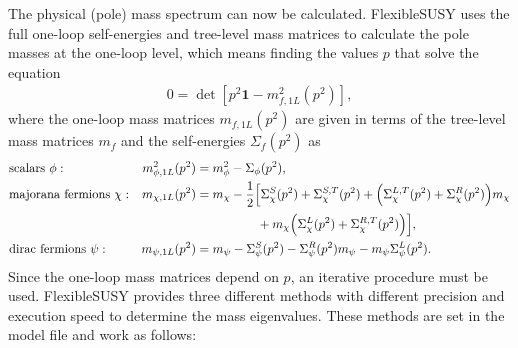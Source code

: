\documentclass[final,3p,11pt,pdflatex]{elsarticle}
\makeatletter
\newcommand{\fs}{FlexibleSUSY\@\xspace}
\newcommand{\unity}{\mathbf{1}}
\makeatother
\begin{document}
The physical (pole) mass spectrum can now be calculated.  \fs uses the
full one-loop self-energies and tree-level mass matrices to calculate
the pole masses at the one-loop level, which means finding the values
$p$ that solve the equation
%
\begin{align}
  0 = \det\left[p^2\unity - m^2_{f,1L}(p^2)\right],
\end{align}
%
where the one-loop mass matrices $m_{f,1L}(p^2)$ are given in terms of
the tree-level mass matrices $m_f$ and the self-energies
$\Sigma_f(p^2)$ as
%
\begin{align}
  &\text{scalars } \phi: &
  m^2_{\phi,1L}(p^2) &= m^2_{\phi} - \Sigma_\phi(p^2), \\
  &\text{majorana fermions } \chi: &
  m_{\chi,1L}(p^2) &= m_{\chi} - \frac{1}{2}\Big[
    \Sigma_\chi^S(p^2) + \Sigma_\chi^{S,T}(p^2)
    + \Big( \Sigma_\chi^{L,T}(p^2) + \Sigma_\chi^R(p^2) \Big) m_{\chi} \notag \\
    &&&\phantom{= m_{\chi} - \frac{1}{2}\Big[}
    + m_{\chi} \Big( \Sigma_\chi^L(p^2) + \Sigma_\chi^{R,T}(p^2) \Big)
  \Big], \\
  &\text{dirac fermions } \psi: &
  m_{\psi,1L}(p^2) &= m_{\psi}
  - \Sigma_\psi^S(p^2)
  - \Sigma_\psi^R(p^2) m_{\psi}
  - m_{\psi} \Sigma_\psi^L(p^2) .
\end{align}
%
Since the one-loop mass matrices depend on $p$, an iterative procedure
must be used.  \fs provides three different methods with different
precision and execution speed to determine the mass eigenvalues.
These methods are set in the model file and work as follows:
%
\end{document}
